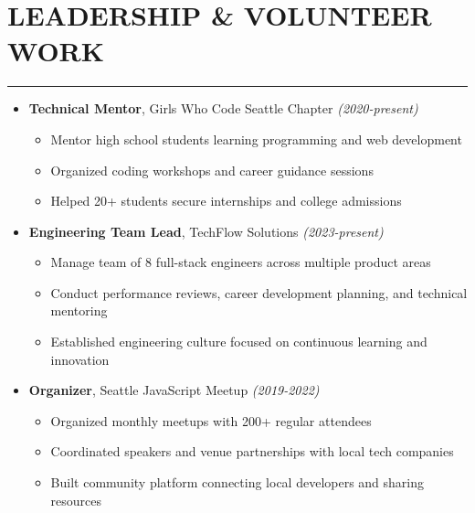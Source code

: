 \documentclass[a4paper,10pt]{article}           %
\begin{document}
    \section*{LEADERSHIP \& VOLUNTEER WORK}
    \vspace{-0.5em}
    \hrule
    \vspace{0.3cm}
    \begin{itemize}[leftmargin=0.2cm, itemsep=0pt, label=--]
        \item \textbf{Technical Mentor}, Girls Who Code Seattle Chapter \hfill \textit{(2020-present)}
        \begin{itemize}[leftmargin=0.4cm, itemsep=0pt, label=$\circ$]
            \item Mentor high school students learning programming and web development
            \item Organized coding workshops and career guidance sessions
            \item Helped 20+ students secure internships and college admissions
        \end{itemize}
        \item \textbf{Engineering Team Lead}, TechFlow Solutions \hfill \textit{(2023-present)}
        \begin{itemize}[leftmargin=0.4cm, itemsep=0pt, label=$\circ$]
            \item Manage team of 8 full-stack engineers across multiple product areas
            \item Conduct performance reviews, career development planning, and technical mentoring
            \item Established engineering culture focused on continuous learning and innovation
        \end{itemize}
        \item \textbf{Organizer}, Seattle JavaScript Meetup \hfill \textit{(2019-2022)}
        \begin{itemize}[leftmargin=0.4cm, itemsep=0pt, label=$\circ$]
            \item Organized monthly meetups with 200+ regular attendees
            \item Coordinated speakers and venue partnerships with local tech companies
            \item Built community platform connecting local developers and sharing resources
        \end{itemize}
    \end{itemize}
\end{document}
